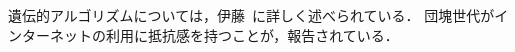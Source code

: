 
	
	遺伝的アルゴリズムについては，伊藤~\cite{110009437921}に詳しく述べられている．
	団塊世代がインターネットの利用に抵抗感を持つことが，報告されている．~\cite{Suo2012}
	
	
	
	
